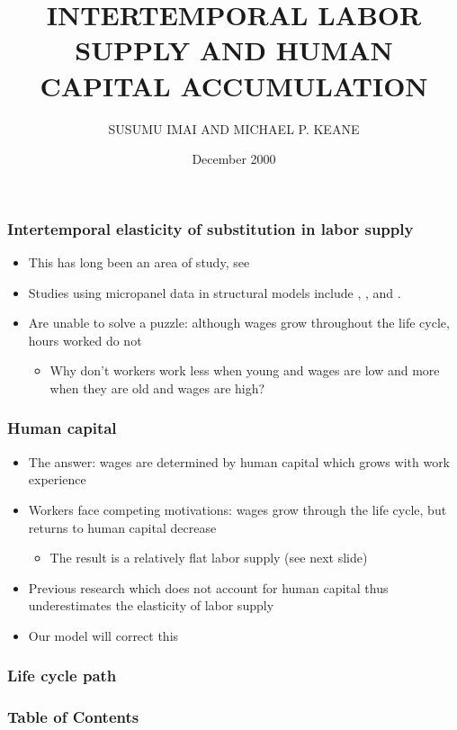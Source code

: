 \documentclass{beamer}
\title{INTERTEMPORAL LABOR SUPPLY AND HUMAN CAPITAL ACCUMULATION}
\author{SUSUMU IMAI AND MICHAEL P. KEANE}
\date{December 2000}
\begin{document}
\frame{\titlepage}

\begin{frame}
  \frametitle{Intertemporal elasticity of substitution in labor supply}
  \begin{itemize}
  \item This has long been an area of study, see \cite{Lucas1969-ti}
  \item Studies using micropanel data in structural models include \cite{MaCurdy1981-iy}, \cite{Browning1985-ox}, and \cite{Altonji1986-zf}.
  \item Are unable to solve a puzzle: although wages grow throughout the life cycle, hours worked do not
    \begin{itemize}
    \item Why don't workers work less when young and wages are low and more when they are old and wages are high?
      \end{itemize}
  \end{itemize}
\end{frame}

\begin{frame}
  \frametitle{Human capital}
  \begin{itemize}
  \item The answer: wages are determined by human capital which grows with work experience
  \item Workers face competing motivations: wages grow through the life cycle, but returns to human capital decrease
        \begin{itemize}
        \item The result is a relatively flat labor supply (see next slide)
        \end{itemize}
      \item Previous research which does not account for human capital thus underestimates the elasticity of labor supply
        \item Our model will correct this
  \end{itemize}
\end{frame}

\begin{frame}
 \frametitle{Life cycle path}

\end{frame}

\begin{frame}
  \frametitle{Table of Contents}
  \tableofcontents
\end{frame}
    
\end{document}
